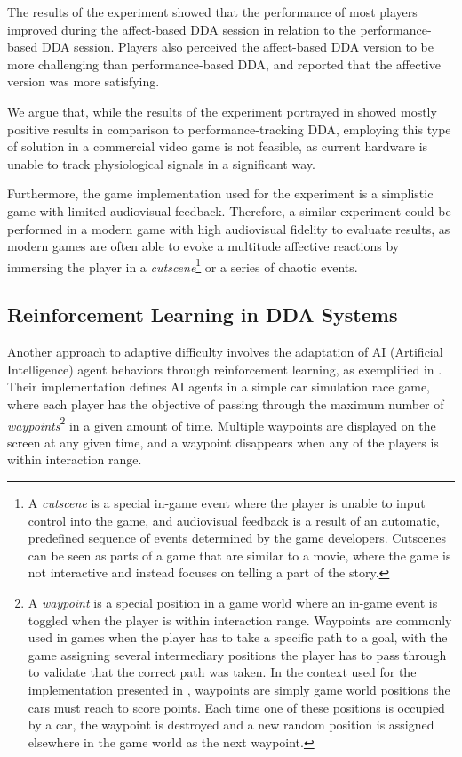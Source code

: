 The results of the experiment showed that the performance of most players improved during the affect-based DDA session in relation to the performance-based DDA session. Players also perceived the affect-based DDA version to be more challenging than performance-based DDA, and reported that the affective version was more satisfying.

We argue that, while the results of the experiment portrayed in \cite{article_affectivedda} showed mostly positive results in comparison to performance-tracking DDA, employing this type of solution in a commercial video game is not feasible, as current hardware is unable to track physiological signals in a significant way. 

Furthermore, the game implementation used for the experiment is a simplistic game with limited audiovisual feedback. Therefore, a similar experiment could be performed in a modern game with high audiovisual fidelity to evaluate results, as modern games are often able to evoke a multitude affective reactions by immersing the player in a \emph{cutscene}\footnote{A \emph{cutscene} is a special in-game event where the player is unable to input control into the game, and audiovisual feedback is a result of an automatic, predefined sequence of events determined by the game developers. Cutscenes can be seen as parts of a game that are similar to a movie, where the game is not interactive and instead focuses on telling a part of the story.} or a series of chaotic events.


\subsection{Reinforcement Learning in DDA Systems}

Another approach to adaptive difficulty involves the adaptation of AI (Artificial Intelligence) agent behaviors through reinforcement learning, as exemplified in \cite{article_adaptivebehaviorai}. Their implementation defines AI agents in a simple car simulation race game, where each player has the objective of passing through the maximum number of \emph{waypoints}\footnote{A \emph{waypoint} is a special position in a game world where an in-game event is toggled when the player is within interaction range. Waypoints are commonly used in games when the player has to take a specific path to a goal, with the game assigning several intermediary positions the player has to pass through to validate that the correct path was taken. In the context used for the implementation presented in \cite{article_adaptivebehaviorai}, waypoints are simply game world positions the cars must reach to score points. Each time one of these positions is occupied by a car, the waypoint is destroyed and a new random position is assigned elsewhere in the game world as the next waypoint.} in a given amount of time. Multiple waypoints are displayed on the screen at any given time, and a waypoint disappears when any of the players is within interaction range.

